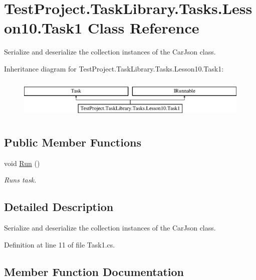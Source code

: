 \hypertarget{class_test_project_1_1_task_library_1_1_tasks_1_1_lesson10_1_1_task1}{}\section{Test\+Project.\+Task\+Library.\+Tasks.\+Lesson10.\+Task1 Class Reference}
\label{class_test_project_1_1_task_library_1_1_tasks_1_1_lesson10_1_1_task1}


Serialize and deserialize the collection instances of the Car\+Json class.  


Inheritance diagram for Test\+Project.\+Task\+Library.\+Tasks.\+Lesson10.\+Task1\+:\begin{figure}[H]
\begin{center}
\leavevmode
\includegraphics[height=1.964912cm]{class_test_project_1_1_task_library_1_1_tasks_1_1_lesson10_1_1_task1}
\end{center}
\end{figure}
\subsection*{Public Member Functions}
\begin{DoxyCompactItemize}
\item 
void \mbox{\hyperlink{class_test_project_1_1_task_library_1_1_tasks_1_1_lesson10_1_1_task1_ad381ed67bbbbcc4dc6714b38456be87e}{Run}} ()
\begin{DoxyCompactList}\small\item\em Runs task. \end{DoxyCompactList}\end{DoxyCompactItemize}


\subsection{Detailed Description}
Serialize and deserialize the collection instances of the Car\+Json class. 



Definition at line 11 of file Task1.\+cs.



\subsection{Member Function Documentation}
\mbox{\label{class_test_project_1_1_task_library_1_1_tasks_1_1_lesson10_1_1_task1_ad381ed67bbbbcc4dc6714b38456be87e}} 
